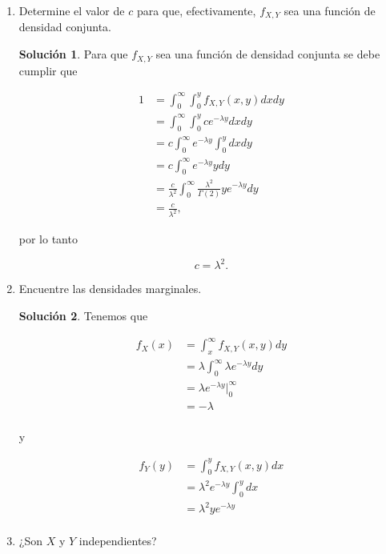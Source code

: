 \documentclass[letterpaper]{article}
\theoremstyle{definition}
\theoremstyle{lemathm}
\theoremstyle{lemathm}
\newtheorem{sol}{Solución}
\theoremstyle{lemathm}
\theoremstyle{lemademthm}
\newcommand{\pars}[1]{\left( #1 \right) }
\newcommand{\1}{\mathbbm{1}}
\begin{document}
\begin{enumerate}
		\begin{enumerate}
			\item Determine el valor de $c$ para que, efectivamente, $f_{X,Y}$ sea una función de densidad conjunta.
			
			\begin{sol}
				Para que $f_{X,Y}$ sea una función de densidad conjunta se debe cumplir que

				\begin{align*}
					1 &= \int_{0}^{\infty}\int_{0}^{y}f_{X,Y}\pars{x,y}dxdy\\
					&= \int_{0}^{\infty}\int_{0}^{y}ce^{-\lambda y}dxdy\\
					&= c\int_{0}^{\infty}e^{-\lambda y}\int_{0}^{y}dxdy\\
					&= c\int_{0}^{\infty}e^{-\lambda y}ydy\\
					&= \frac{c}{\lambda^2}\int_{0}^{\infty}\frac{\lambda^2}{\Gamma\pars{2}} y e^{-\lambda y}dy\\
					&= \frac{c}{\lambda^2},
				\end{align*}

				por lo tanto

				\[c = \lambda^2.\]
			\end{sol}

			\item Encuentre las densidades marginales.
			
			\begin{sol}
				Tenemos que

				\begin{align*}
					f_X\pars{x} &= \int_{x}^{\infty}f_{X,Y}\pars{x,y}dy\\
					&= \lambda \int_{0}^{\infty}\lambda e^{-\lambda y}dy\\
					&= \lambda e^{-\lambda y}\biggr\rvert_{0}^{\infty}\\
					&= -\lambda\\
				\end{align*}

				y

				\begin{align*}
					f_Y\pars{y} &= \int_{0}^{y}f_{X,Y}\pars{x,y}dx\\
					&= \lambda^2 e^{-\lambda y} \int_{0}^{y} dx\\
					&= \lambda^2y e^{-\lambda y}\\
				\end{align*}
			\end{sol}

			\item ¿Son $X$ y $Y$ independientes?
			

\end{enumerate}
\end{enumerate}
\end{document}
